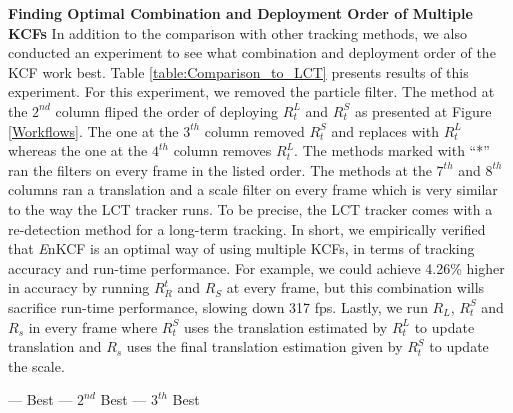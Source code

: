\documentclass[10pt,twocolumn,letterpaper]{article}
\begin{document}
\textbf{Finding Optimal Combination and Deployment Order of Multiple
  KCFs} In addition to the comparison with other tracking methods, we
also conducted an experiment to see what combination and deployment
order of the KCF work best. Table \ref{table:Comparison_to_LCT}
presents results of this experiment. For this experiment, we removed
the particle filter. The method at the $2^{nd}$ column fliped the
order of deploying $R_{t}^{L}$ and $R_{t}^{S}$ as presented at Figure
\ref{Workflows}. The one at the $3^{th}$ column removed $R_{t}^{S}$
and replaces with $R_{t}^{L}$ whereas the one at the $4^{th}$ column
removes $R_{t}^{L}$. The methods marked with ``*'' ran the filters on
every frame in the listed order. The methods at the $7^{th}$ and
$8^{th}$ columns ran a translation and a scale filter on every frame
which is very similar to the way the LCT tracker \cite{ma2015long}
runs. To be precise, the LCT tracker comes with a re-detection method
for a long-term tracking. In short, we empirically verified that
\textit{E}nKCF is an optimal way of using multiple KCFs, in terms of
tracking accuracy and run-time performance. For example, we could
achieve 4.26\% higher in accuracy by running $R_{R}^{t}$ and $R_{S}$
at every frame, but this combination wills sacrifice run-time
performance, slowing down 317 fps. Lastly, we run $R_{L}$, $R_{t}^{S}$
and $R_{s}$ in every frame where $R_{t}^{S}$ uses the translation
estimated by $R_{t}^{L}$ to update translation and $R_{s}$ uses the
final translation estimation given by $R_{t}^{S}$ to update the scale.
\begin{table}[!h]
\smaller
\begin{center}
\color{green}--- Best \hspace{.15\linewidth}\color{red}--- $2^{nd}$ Best \hspace{.15\linewidth}\color{blue}--- $3^{th}$ Best \color{black}\\
\end{center}
\caption{Results of running different combinations of the KCFs for
  UAV123 dataset. This table empirically supported the usefulness of
  combining multiple KCFs as long as the deployment order is optimal.}
\label{table:Comparison_to_LCT}
\end{table}
\end{document}

